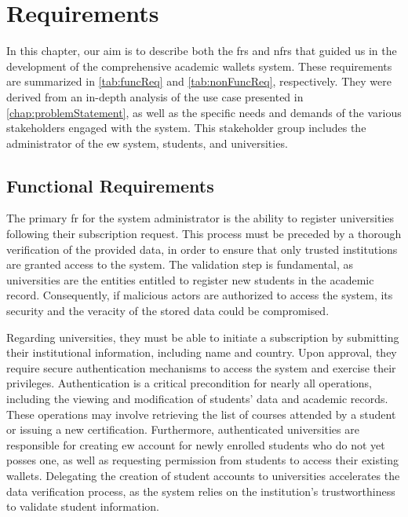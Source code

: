 \chapter{Requirements}
\label{chap:requirements}
In this chapter, our aim is to describe both the \glspl{fr} and \glspl{nfr} that guided us in the development of the comprehensive academic wallets system. These requirements are summarized in \cref{tab:funcReq} and \cref{tab:nonFuncReq}, respectively. They were derived from an in-depth analysis of the use case presented in \cref{chap:problemStatement}, as well as the specific needs and demands of the various stakeholders engaged with the system. This stakeholder group includes the administrator of the \gls{ew} system, students, and universities.



\section{Functional Requirements}
The primary \gls{fr} for the system administrator is the ability to register universities following their subscription request. This process must be preceded by a thorough verification of the provided data, in order to ensure that only trusted institutions are granted access to the system. The validation step is fundamental, as universities are the entities entitled to register new students in the academic record. Consequently, if malicious actors are authorized to access the system, its security and the veracity of the stored data could be compromised.

Regarding universities, they must be able to initiate a subscription by submitting their institutional information, including name and country. Upon approval, they require secure authentication mechanisms to access the system and exercise their privileges. Authentication is a critical precondition for nearly all operations, including the viewing and modification of students' data and academic records. These operations may involve retrieving the list of courses attended by a student or issuing a new certification. Furthermore, authenticated universities are responsible for creating \gls{ew} account for newly enrolled students who do not yet posses one, as well as requesting permission from students to access their existing wallets. Delegating the creation of student accounts to universities accelerates the data verification process, as the system relies on the institution's trustworthiness to validate student information. 


